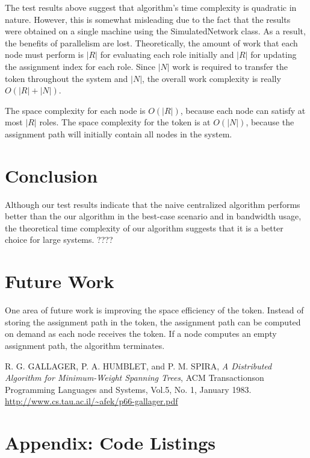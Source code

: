 \documentclass[11pt]{article}
\begin{document}
\begin{multicols}{2}
The test results above suggest that algorithm's time complexity is quadratic in nature. However, this is somewhat misleading due to the fact that the results were obtained on a single machine using the SimulatedNetwork class. As a result, the benefits of parallelism are lost. Theoretically, the amount of work that each node must perform is $|R|$ for evaluating each role initially and $|R|$ for updating the assignment index for each role. Since $|N|$ work is required to transfer the token throughout the system and $|N|$, the overall work complexity is really $O(|R| + |N|)$.

The space complexity for each node is $O(|R|)$, because each node can satisfy at most $|R|$ roles. The space complexity for the token is at $O(|N|)$, because the assignment path will initially contain all nodes in the system.

\section{Conclusion}
Although our test results indicate that the naive centralized algorithm performs better than the our algorithm in the best-case scenario and in bandwidth usage, the theoretical time complexity of our algorithm suggests that it is a better choice for large systems. ????

\section{Future Work}
One area of future work is improving the space efficiency of the token. Instead of storing the assignment path in the token, the assignment path can be computed on demand as each node receives the token. If a node computes an empty assignment path, the algorithm terminates.

\end{multicols}
\begin{thebibliography}{9}

  R. G. GALLAGER, P. A. HUMBLET, and P. M. SPIRA,
  \emph{A Distributed Algorithm for Minimum-Weight Spanning Trees},
  ACM Transactionson Programming Languages and Systems, Vol.5, No. 1, January 1983.
  \url{http://www.cs.tau.ac.il/~afek/p66-gallager.pdf}

\end{thebibliography}

\section{Appendix: Code Listings}
\appendix
\end{document}
